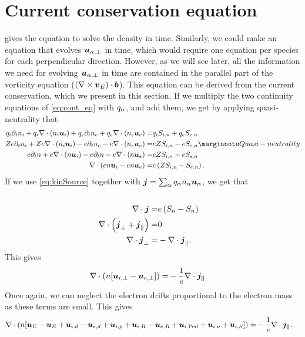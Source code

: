 \section{Current conservation equation}
\label{sec:curConserve}
%
 gives the equation to solve the density in time.
Similarly, we could make an equation that evolves $\boldsymbol{u}_{\alpha,\perp}$ in time, which would require one equation per species for each perpendicular direction.
However, as we will see later, all the information we need for evolving $\boldsymbol{u}_{\alpha,\perp}$ in time are contained in the parallel part of the vorticity equation ($(\nabla\times \boldsymbol{v}_E)\cdot \boldsymbol{b}$).
This equation can be derived from the current conservation, which we present in this section.
If we multiply the two continuity equations of \cref{eq:cont_eq} with $q_\alpha$, and add them, we get by applying quasi-neutrality that
%
\begin{align*}
    q_i\partial_t n_i + q_i\div (n_i \ve{u}_i)
    + q_e\partial_t n_e + q_e\div (n_e \ve{u}_e)
    =&
    q_iS_{i,n} + q_eS_{e,n}
    \\
    Ze\partial_t n_i + Ze\div (n_i \ve{u}_i)
    - e\partial_t n_e - e\div (n_e \ve{u}_e)
    =&
    eZS_{i,n} - eS_{e,n}
    \note{Quasi-neutrality}
    \\
    e\partial_t n + e\div (n \ve{u}_i)
    - e\partial_t n - e\div (n \ve{u}_e)
    =&
    eZS_{i,n} - eS_{e,n}
    \\
    \div (en \ve{u}_i - en \ve{u}_e) =&
    e\L(ZS_{i,n} - S_{e,n}\R).
\end{align*}
%
If we use \cref{eq:kinSource} together with $\boldsymbol{j} = \sum_{\alpha}q_\alpha n_\alpha\boldsymbol{u}_\alpha$, we get that
%
\begin{align*}
    \\
    \nabla\cdot \boldsymbol{j} =&
    e\left(S_{n} - S_{n}\right)
    \\
    \nabla\cdot \left( \boldsymbol{j}_\perp + \boldsymbol{j}_\|\right)=& 0
    \\
    \nabla\cdot \boldsymbol{j}_\perp =& -\nabla\cdot \boldsymbol{j}_\|.
\end{align*}
%
This gives
%
\begin{align*}
    \nabla\cdot \left( n [\boldsymbol{u}_{i,\perp} - \boldsymbol{u}_{e,\perp}] \right) =&
    -\frac{1}{e}\nabla\cdot \boldsymbol{j_\|}.
\end{align*}
%
Once again, we can neglect the electron drifts proportional to the electron mass as these terms are small.
This gives
%
\begin{align}
    \nabla\cdot \left( n [
   \boldsymbol{u}_{E} - \boldsymbol{u}_{E}
  +\boldsymbol{u}_{i,d} - \boldsymbol{u}_{e,d}
  +\boldsymbol{u}_{i,p}
  +\boldsymbol{u}_{i,R} - \boldsymbol{u}_{e,R}
  +\boldsymbol{u}_{i,\text{Ped}}
  +\boldsymbol{u}_{i,\nu}
  +\boldsymbol{u}_{i,S}
  ] \right) =&
  -\frac{1}{e}\nabla\cdot \boldsymbol{j_\|}.
  \label{eq:current_drifts}
\end{align}
